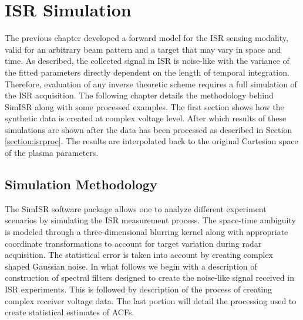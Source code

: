 \chapter{ISR Simulation}
\label{chapter:stisrs}
\thispagestyle{myheadings}

\graphicspath{{4_STISRS/Figures/}}


The previous chapter developed a forward model for the ISR sensing modality, valid for an arbitrary beam pattern and a target that may vary in space and time.   As described, the collected signal in ISR is noise-like with the variance of the fitted parameters directly dependent on the length of temporal integration.   Therefore, evaluation of any inverse theoretic scheme requires a full simulation of the ISR acquisition. The following chapter details the methodology behind SimISR along with some processed examples. The first section shows how the synthetic data is created at complex voltage level. After which results of these simulations are shown after the data has been processed as described in Section \ref{section:isrproc}. The results are interpolated back to the original Cartesian space of the plasma parameters. 

\section{Simulation Methodology}
\label{sec:simmeth}
The SimISR software package allows one to analyze different  experiment scenarios by simulating the ISR measurement process. %
The space-time ambiguity is modeled through a three-dimensional blurring kernel along with appropriate coordinate transformations to account for target variation during radar acquisition.   The statistical error is taken into account by creating complex shaped Gaussian noise.    
In what follows we begin with a description of construction of spectral filters designed to create the noise-like signal received in ISR experiments. This is followed by description of the process of creating complex receiver voltage data. The last portion will detail the processing used to create statistical estimates of ACFs.


